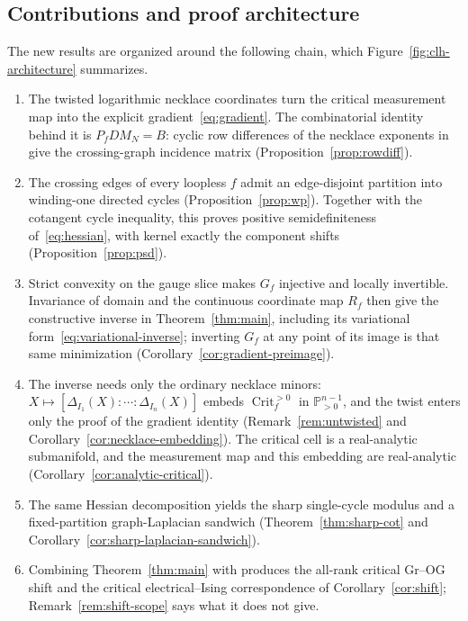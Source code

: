 \documentclass[11pt]{article}
\theoremstyle{definition}
\DeclareMathOperator{\Crit}{Crit}
\newcommand{\Critf}{\Crit_f^{>0}}
\begin{document}
\subsection*{Contributions and proof architecture}
The new results are organized around the following chain, which Figure~\ref{fig:clh-architecture}
summarizes.
\begin{enumerate}
\item The twisted logarithmic necklace coordinates turn the critical measurement map into the explicit
gradient~\eqref{eq:gradient}. The combinatorial identity behind it is
$P_fDM_N=B$: cyclic row differences of the necklace exponents in
\cite[Prop.~5.12]{Galashin} give the crossing-graph incidence matrix
(Proposition~\ref{prop:rowdiff}).
\item The crossing edges of every loopless $f$ admit an edge-disjoint partition into winding-one
directed cycles (Proposition~\ref{prop:wp}). Together with the cotangent cycle inequality, this proves
positive semidefiniteness of~\eqref{eq:hessian}, with kernel exactly the component shifts
(Proposition~\ref{prop:psd}).
\item Strict convexity on the gauge slice makes $G_f$ injective and locally invertible. Invariance of
domain and the continuous coordinate map $R_f$ then give the constructive inverse in
Theorem~\ref{thm:main}, including its variational form~\eqref{eq:variational-inverse}; inverting $G_f$
at any point of its image is that same minimization (Corollary~\ref{cor:gradient-preimage}).
\item The inverse needs only the ordinary necklace minors: $X\mapsto[\Delta_{I_1}(X):\cdots:\Delta_{I_n}(X)]$
embeds $\Critf$ in $\mathbb P^{n-1}_{>0}$, and the twist enters only the proof of the gradient identity
(Remark~\ref{rem:untwisted} and Corollary~\ref{cor:necklace-embedding}). The critical cell is a
real-analytic submanifold, and the measurement map and this embedding are real-analytic
(Corollary~\ref{cor:analytic-critical}).
\item The same Hessian decomposition yields the sharp single-cycle modulus and a fixed-partition
graph-Laplacian sandwich (Theorem~\ref{thm:sharp-cot} and
Corollary~\ref{cor:sharp-laplacian-sandwich}).
\item Combining Theorem~\ref{thm:main} with \cite[Prop.~8.9]{Galashin} produces the all-rank critical
Gr--OG shift and the critical electrical--Ising correspondence of Corollary~\ref{cor:shift}; Remark~\ref{rem:shift-scope}
says what it does not give.
\end{enumerate}
\end{document}
